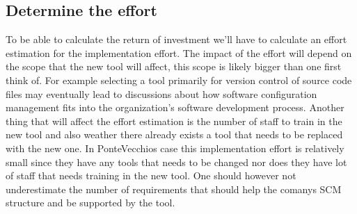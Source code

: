 \documentclass[10pt]{article}
\begin{document}
\subsection{Determine the effort}
To be able to calculate the return of investment we'll have to calculate an effort estimation for the implementation effort. The impact of the effort will depend on the scope that the new tool will affect, this scope is likely bigger than one first think of. For example selecting a tool primarily for version control of source code files may eventually lead to discussions about how software configuration management fits into the organization's software development process. Another thing that will affect the effort estimation is the number of staff to train in the new tool and also weather there already exists a tool that needs to be replaced with the new one. In PonteVecchios case this implementation effort is relatively small since they  have any tools that needs to be changed nor does they have lot of staff that needs training in the new tool.
One should however not underestimate the number of requirements that should help the comanys SCM structure and be supported by the tool.
\end{document}

